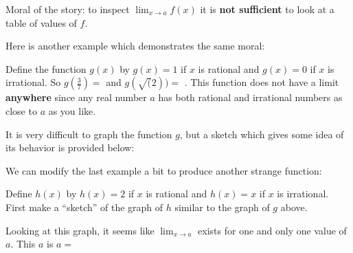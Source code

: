 \documentclass{ximera}
\begin{document}
Moral of the story:  to inspect $\lim_{x \to a} f(x)$ it is \textbf{not sufficient} to look at a table of values of $f$. 

Here is another example which demonstrates the same moral:

\begin{question}
	Define the function $g(x)$ by $g(x) = 1$ if $x$ is rational and $g(x) = 0$ if $x$ is irrational.  So $g(\frac{3}{7}) =$  and $g(\sqrt(2)) =$ .
	This function does not have a limit \textbf{anywhere} since any real number $a$ has both rational and irrational numbers  as close to $a$ as you like.
	
	It is very difficult to graph the function $g$, but a sketch which gives some idea of its behavior is provided below:
	
\end{question}

\begin{question}
We can modify the last example a bit to produce another strange function:

Define $h(x)$ by $h(x) = 2$ if $x$ is rational and $h(x) = x$ if $x$ is irrational.  First make a ``sketch'' of the graph of $h$ similar to the graph of $g$ above.

Looking at this graph, it seems like $\lim_{x \to a} $ exists for one and only one value of $a$.  This $a$ is $a = $  
\end{question}
\end{document}
